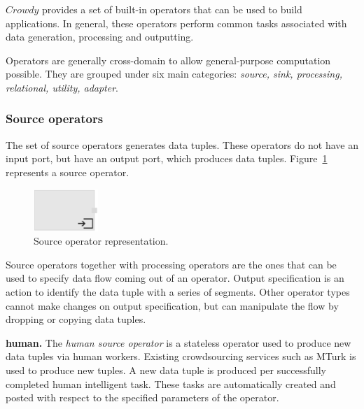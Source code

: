 $Crowdy$ provides a set of built-in operators that can be used to build applications. 
In general, these operators perform common tasks associated with data generation, 
processing and outputting.

Operators are generally cross-domain to allow general-purpose 
computation possible. They are grouped under six main categories: 
\textit{source, sink, processing, relational, utility, adapter}.

\subsubsection{Source operators}
The set of source operators generates data tuples. These operators do not have 
an input port, but have an output port, which produces data tuples. Figure~\ref{fig:source operator} 
represents a source operator.

\begin{figure}[ht]
	\centering
	\includegraphics[height=60px]{figures/SourceOperator.pdf}
	\caption{Source operator representation.}
	\label{fig:source operator}
\end{figure}

Source operators together with processing operators are the ones that can be 
used to specify data flow coming out of an operator. Output specification is an 
action to identify the data tuple with a series of segments. Other operator types 
cannot make changes on output specification, but can manipulate the flow by dropping 
or copying data tuples.

\textbf{human.} 
The \textit{human source operator} is a stateless operator used to produce new data tuples 
via human workers. Existing crowdsourcing services such as MTurk is used 
to produce new tuples. A new data tuple is produced per successfully completed 
human intelligent task. These tasks are automatically created and posted with 
respect to the specified parameters of the operator.

